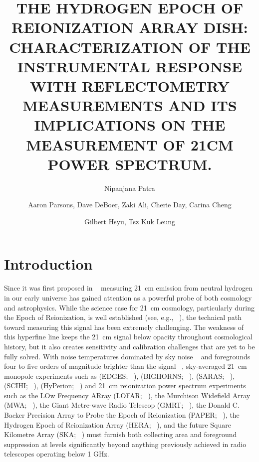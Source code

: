\documentclass[twocolumn]{emulateapj}
\begin{document}
\title{THE HYDROGEN EPOCH OF REIONIZATION ARRAY DISH: CHARACTERIZATION OF  THE INSTRUMENTAL RESPONSE WITH REFLECTOMETRY MEASUREMENTS AND ITS IMPLICATIONS ON THE MEASUREMENT OF 21CM POWER SPECTRUM. } 

\author{Nipanjana Patra }
\author{Aaron Parsons, Dave DeBoer, Zaki Ali, Cherie Day, Carina Cheng}
\author{Gilbert Hsyu, Tsz Kuk Leung}

\begin{abstract}
\end{abstract}


\section{Introduction}

Since it was first proposed in ~\citep{Shaver_et_al1999} measuring 21~cm
emission from neutral hydrogen in our early universe has gained attention as a
powerful probe of both cosmology and astrophysics.  While the science case for
21~cm cosmology, particularly during the Epoch of Reionization, is well
established (see, e.g.,
~\citep{furlanetto_et_al2006,morales_wyithe2010,pritchard_loeb2012}),
the technical path toward measuring this signal has been extremely challenging.  The
weakness of this hyperfine line keeps the 21~cm signal below opacity throughout
cosmological history, but it also creates sensitivity and calibration
challenges that are yet to be fully solved.  With noise temperatures dominated
by sky noise ~\citep{XXX} and foregrounds four to five orders of magnitude
brighter than the signal ~\citep{XXX}, 
sky-averaged 21~cm monopole experiments such as
(EDGES; ~\citealt{XXX}),
(BIGHORNS; ~\citealt{XXX}),
(SARAS; ~\citealt{patra_et_al2014}),
(SCIHI; ~\citealt{voytek_et_al2014}),
(HyPerion; ~\citealt{presley_et_al2015})
and 21~cm reionization power spectrum experiments such as
the LOw Frequency ARray (LOFAR; ~\citealt{XXX}),
the Murchison Widefield Array (MWA; ~\citealt{XXX}),
the Giant Metre-wave Radio Telescop (GMRT; ~\citealt{XXX}),
the Donald C. Backer Precision Array to Probe the Epoch of Reionization (PAPER; ~\citealt{parsons_et_al2010}),
the Hydrogen Epoch of Reionization Array (HERA; ~\citealt{XXX}),
and the future Square Kilometre Array (SKA; ~\citealt{XXX})
must
furnish both collecting area and foreground suppression at levels significantly
beyond anything previously achieved in radio telescopes operating below 1 GHz.
\end{document}
